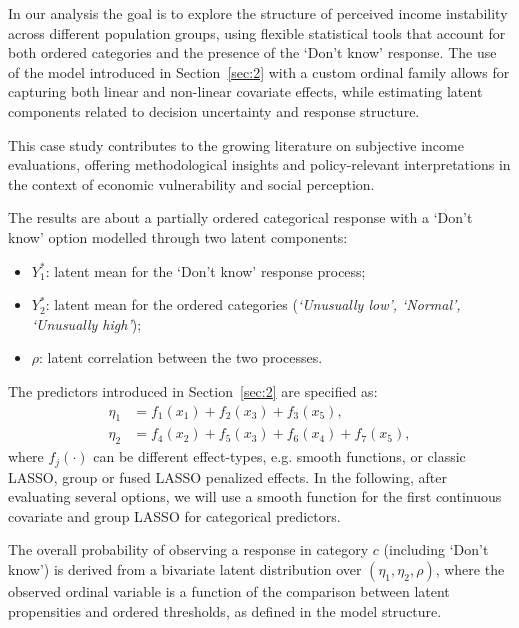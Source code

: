 \documentclass[submit]{smj}
\begin{document}
In our analysis the goal is to explore the structure of perceived income instability across different population groups, using flexible statistical tools that account for both ordered categories and the presence of the `Don't know' response. The use of the model introduced in Section~\ref{sec:2} with a custom ordinal family allows for capturing both linear and non-linear covariate effects, while estimating latent components related to decision uncertainty and response structure.

This case study contributes to the growing literature on subjective income evaluations, offering methodological insights and policy-relevant interpretations in the context of economic vulnerability and social perception.

The results are about a partially ordered categorical response with a `Don't know' option modelled through two latent components:
\begin{itemize}
  \item $Y^*_1$: latent mean for the `Don't know'  response process;
  \item $Y^*_2$: latent mean for the ordered categories (\emph{`Unusually low', `Normal', `Unusually high'});
  \item $\rho$: latent correlation between the two processes.
\end{itemize}
The predictors introduced in Section~\ref{sec:2} are specified as:
\begin{equation}\label{smooth}
\begin{aligned}
\eta_{1} &= f_{1}(x_{1}) + f_{2}(x_{3}) + f_{3}(x_{5}), \\
\eta_{2} &= f_{4}(x_{2}) + f_{5}(x_{3}) + f_{6}(x_{4}) + f_{7}(x_{5}),
\end{aligned}
\end{equation}
where $f_j(\cdot)$ can be different effect-types, e.g. smooth functions, or classic LASSO, group or fused LASSO penalized effects. In the following, after evaluating several options, we will use a smooth function for the first continuous covariate and group LASSO for categorical predictors.

The overall probability of observing a response in category \(c\) (including `Don't know') is derived from a bivariate latent distribution over \((\eta_1, \eta_2, \rho)\), where the observed ordinal variable is a function of the comparison between latent propensities and ordered thresholds, as defined in the model structure.
\end{document}
